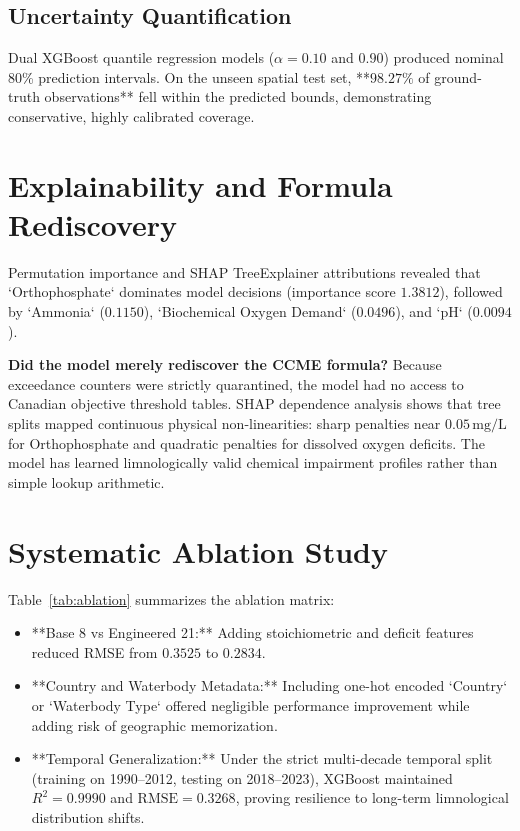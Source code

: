 \documentclass[journal,10pt,twocolumn]{IEEEtran}
\begin{document}
\subsection{Uncertainty Quantification}
Dual XGBoost quantile regression models ($\alpha = 0.10$ and $0.90$) produced nominal 80\% prediction intervals. On the unseen spatial test set, **$98.27\%$ of ground-truth observations** fell within the predicted bounds, demonstrating conservative, highly calibrated coverage.

\section{Explainability and Formula Rediscovery}
Permutation importance and SHAP TreeExplainer attributions revealed that `Orthophosphate` dominates model decisions (importance score $1.3812$), followed by `Ammonia` ($0.1150$), `Biochemical Oxygen Demand` ($0.0496$), and `pH` ($0.0094$).

\textbf{Did the model merely rediscover the CCME formula?}  
Because exceedance counters were strictly quarantined, the model had no access to Canadian objective threshold tables. SHAP dependence analysis shows that tree splits mapped continuous physical non-linearities: sharp penalties near $0.05\,\text{mg/L}$ for Orthophosphate and quadratic penalties for dissolved oxygen deficits. The model has learned limnologically valid chemical impairment profiles rather than simple lookup arithmetic.

\section{Systematic Ablation Study}
Table~\ref{tab:ablation} summarizes the ablation matrix:
\begin{itemize}
    \item **Base 8 vs Engineered 21:** Adding stoichiometric and deficit features reduced RMSE from $0.3525$ to $0.2834$.
    \item **Country and Waterbody Metadata:** Including one-hot encoded `Country` or `Waterbody Type` offered negligible performance improvement while adding risk of geographic memorization.
    \item **Temporal Generalization:** Under the strict multi-decade temporal split (training on 1990--2012, testing on 2018--2023), XGBoost maintained $R^2 = 0.9990$ and $\text{RMSE} = 0.3268$, proving resilience to long-term limnological distribution shifts.
\end{itemize}
\end{document}
